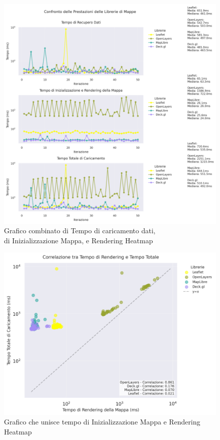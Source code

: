 \begin{figure}[!ht]
    \centering
    \includegraphics[width=\textwidth]{chapters/librerie-plot/data/confronto_benchmark.png}
    \captionsetup{justification=centering}
    \caption{Grafico combinato di Tempo di caricamento dati,\\ di Inizializzazione Mappa, e Rendering Heatmap}
    \label{fig:map_benchmark}
\end{figure}

\begin{figure}[!ht]
    \centering
    \includegraphics[width=\textwidth]{chapters/librerie-plot/data/correlazione_rendering_totale.png}
    \caption{Grafico che unisce tempo di Inizializzazione Mappa e Rendering Heatmap}
    \label{fig:map_xy_plot}
\end{figure}

